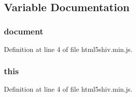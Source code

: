 \subsection{Variable Documentation}
\subsubsection[{document}]{\setlength{\rightskip}{0pt plus 5cm}document}\label{html5shiv_8min_8js_aa14f8e0338cced6720590fd2ea13bd4b}


Definition at line 4 of file html5shiv.\+min.\+js.

\subsubsection[{this}]{\setlength{\rightskip}{0pt plus 5cm}this}\label{html5shiv_8min_8js_a05c09a5e9d53fa7adf0a7936038c2fa3}


Definition at line 4 of file html5shiv.\+min.\+js.

